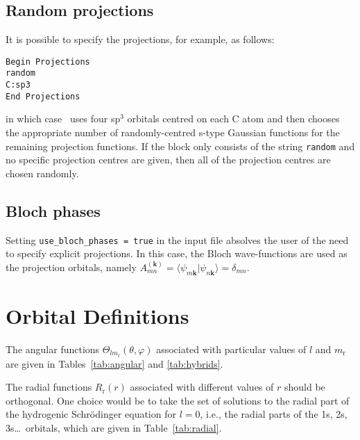 \subsection{Random projections}

It is possible to specify the projections, for example, as follows:

\noindent
\verb#Begin Projections#\\
\verb#random#\\
\verb#C:sp3#\\
\verb#End Projections#

in which case \wannier\ uses four sp$^3$ orbitals centred on each C
atom and then chooses the appropriate number of randomly-centred
s-type Gaussian functions for the remaining projection functions. If
the block only consists of the string {\tt random} and no specific
projection centres are given, then all of the projection centres are
chosen randomly.


\subsection{Bloch phases}

Setting \verb#use_bloch_phases = true# in the input file absolves the
user of the need to specify explicit projections. In this case, the
Bloch wave-functions are used as the projection orbitals, namely
$A_{mn}^{(\mathbf{k})} =
\langle\psi_{m\mathbf{k}}|\psi_{n\mathbf{k}}\rangle = \delta_{mn}$.


\section{Orbital Definitions} \label{sec:orbital-defs}

The angular functions $\Theta_{lm_{\mathrm{r}}}(\theta,\varphi)$
associated with particular values of $l$ and $m_{\mathrm{r}}$ are given
in Tables~\ref{tab:angular} and \ref{tab:hybrids}. 

The radial functions $R_{\mathrm{r}}(r)$ associated with different values of
$r$ should be orthogonal. One choice would be to take the set of
solutions to the radial part of the hydrogenic Schr\"{o}dinger
equation for $l=0$, i.e., the radial parts of the 1s,
2s, 3s\ldots\ orbitals, which are given in Table~\ref{tab:radial}. 


